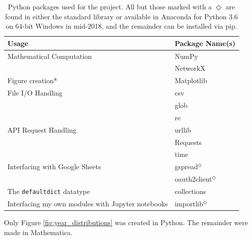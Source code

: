 \documentclass[12pt]{thesis}
\theoremstyle{plain}
\theoremstyle{definition}
\theoremstyle{remark}
\begin{document}
\begin{table}[t]
\centering
\begin{tabular}{| l | l |}
\hline
Usage & Package Name(s) \\ \hline
Mathematical Computation & NumPy \\
& NetworkX \\
\hline
Figure creation* & Matplotlib \\ 
\hline
File I/O Handling & csv\\ 
& glob \\
& re \\
\hline
API Request Handling  & urllib \\
& Requests \\ 
& time \\
\hline
Interfacing with Google Sheets & gspread$^\Diamond$ \\
& oauth2client$^\Diamond$ \\
\hline
The \verb+defaultdict+ datatype & collections \\
\hline
Interfacing my own modules with Jupyter notebooks & importlib$^\Diamond$ \\ 
\hline
\end{tabular}
\caption{Python packages used for the project. All but those marked with a $\Diamond$ are found in either the standard library or available in Anaconda for Python 3.6 on 64-bit Windows in mid-2018, and the remainder can be installed via pip.}
\footnotesize *Only Figure \ref{fig:year_distributions} was created in Python. The remainder were made in Mathematica.
\label{tab:python_packages}
\end{table}
\end{document}
